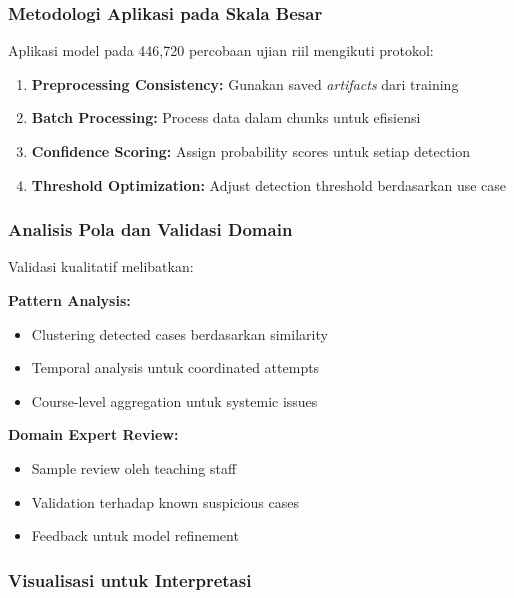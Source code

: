 \subsubsection{Metodologi Aplikasi pada Skala Besar}
\label{sec:aplikasiSkalaBesar}

Aplikasi model pada 446,720 percobaan ujian riil mengikuti protokol:

\begin{enumerate}
    \item \textbf{Preprocessing Consistency:} Gunakan saved \textit{artifacts} dari training
    \item \textbf{Batch Processing:} Process data dalam chunks untuk efisiensi
    \item \textbf{Confidence Scoring:} Assign probability scores untuk setiap detection
    \item \textbf{Threshold Optimization:} Adjust detection threshold berdasarkan use case
\end{enumerate}

\subsubsection{Analisis Pola dan Validasi Domain}
\label{sec:analisisPolaValidasi}

Validasi kualitatif melibatkan:

\textbf{Pattern Analysis:}
\begin{itemize}
    \item Clustering detected cases berdasarkan similarity
    \item Temporal analysis untuk coordinated attempts
    \item Course-level aggregation untuk systemic issues
\end{itemize}

\textbf{Domain Expert Review:}
\begin{itemize}
    \item Sample review oleh teaching staff
    \item Validation terhadap known suspicious cases
    \item Feedback untuk model refinement
\end{itemize}

\subsubsection{Visualisasi untuk Interpretasi}
\label{sec:visualisasiInterpretasi}

